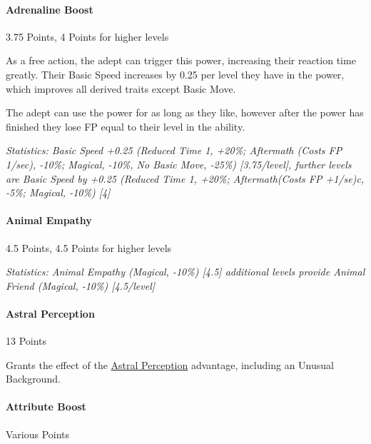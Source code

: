 \begin{multicols}{3}
	\paragraph{Adrenaline Boost}
	\begin{flushright}
		3.75 Points, 4 Points for higher levels
	\end{flushright}
	
	As a free action, the adept can trigger this power, increasing their reaction time greatly. Their Basic Speed increases by 0.25 per level they have in the power, which improves all derived traits except Basic Move. 
	
	The adept can use the power for as long as they like, however after the power has finished they lose FP equal to their level in the ability.
	
	\textcolor{OliveGreen}{\textit{Statistics: Basic Speed +0.25 (Reduced Time 1, +20\%; Aftermath (Costs FP 1/sec), -10\%; Magical, -10\%, No Basic Move, -25\%) [3.75/level], further levels are Basic Speed by +0.25 (Reduced Time 1, +20\%; Aftermath(Costs FP +1/se)c, -5\%; Magical, -10\%) [4] }}
	
	\paragraph{Animal Empathy}
	\begin{flushright}
		4.5 Points, 4.5 Points for higher levels
	\end{flushright}
	
	\textcolor{OliveGreen}{\textit{Statistics: Animal Empathy (Magical, -10\%) [4.5] additional levels provide Animal Friend (Magical, -10\%) [4.5/level]}} 
	
	\paragraph{Astral Perception}
	\begin{flushright}
		13 Points
	\end{flushright}
	
	Grants the effect of the \hyperref[astral_perception]{Astral Perception} advantage, including an Unusual Background.
	
	\paragraph{Attribute Boost }
	\begin{flushright}
	Various Points
	\end{flushright}


\end{multicols}
